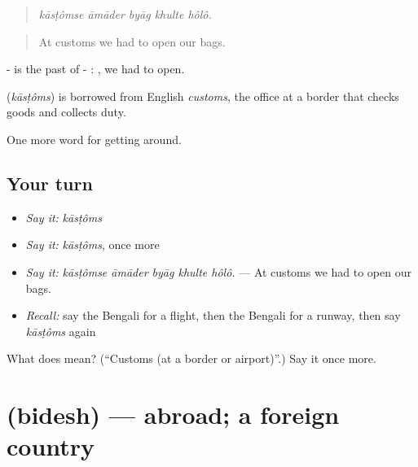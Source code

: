 \begin{quote}
    
\end{quote}

\begin{quote}
\emph{kāsṭômse āmāder byāg khulte hôlô.}
\end{quote}

\begin{quote}
At customs we had to open our bags.
\end{quote}

-  is the past of - :  , we had to open.

\begin{cousinweb}
\textbf{} (\emph{kāsṭôms}) is borrowed from English \emph{customs}, the office at a border that checks goods and collects duty.
\end{cousinweb}

\begin{grammarlens}[title={What you've built}]
One more word for getting around.
\end{grammarlens}

\subsection*{Your turn}
\begin{itemize}
\raggedright
  \item \emph{Say it:} \emph{kāsṭôms}
  \item \emph{Say it:} \emph{kāsṭôms}, once more
  \item \emph{Say it:} \emph{kāsṭômse āmāder byāg khulte hôlô.} — At customs we had to open our bags.
  \item \emph{Recall:} say the Bengali for a flight, then the Bengali for a runway, then say \emph{kāsṭôms} again
\end{itemize}

\begin{tcolorbox}[breakable,colback=teal!4,colframe=teal!35!black,title={Before you move on}]
What does  mean? (\textquotedblleft{}Customs (at a border or airport)\textquotedblright{}.) Say it once more.
\end{tcolorbox}
\section[\texorpdfstring{\bn{বিদেশ} (bidesh)}{বিদেশ (bidesh)}]{ (bidesh) — abroad; a foreign country}


